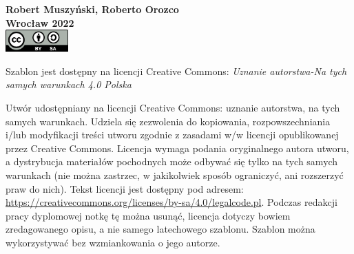 \thispagestyle{empty}
\mbox{}
\vfill

\noindent
{\bf Robert Muszyński, Roberto Orozco}\\
{\bf Wrocław 2022}\\[2ex]
  \includegraphics[width=0.18\textwidth]{figures/CC-BY-SA_icon_svg.png}\hfill
\begin{minipage}[b]{0.79\textwidth}
 \small Szablon jest dostępny na licencji Creative Commons: \emph{Uznanie au\-tor\-stwa-Na tych samych warunkach 4.0 Polska}
\end{minipage}\vspace{2ex}

\noindent
{\normalsize Utwór udostępniany na licencji Creative Commons: uznanie
  autorstwa, na tych samych warunkach. Udziela się zezwolenia do
  kopiowania, rozpowszechniania i/lub modyfikacji treści utworu
  zgodnie z zasadami w/w licencji opublikowanej przez Creative
  Commons. Licencja wymaga podania oryginalnego autora utworu, a
  dystrybucja materiałów pochodnych może odbywać się tylko na tych
  samych warunkach (nie można zastrzec, w jakikolwiek sposób
  ograniczyć, ani rozszerzyć praw do nich). Tekst licencji jest
  dostępny pod
  adresem: \url{https://creativecommons.org/licenses/by-sa/4.0/legalcode.pl}. Podczas
  redakcji pracy dyplomowej notkę tę można usunąć, licencja dotyczy
  bowiem zredagowanego opisu, a nie samego latechowego
  szablonu.  Szablon można wykorzystywać bez wzmiankowania o
  jego autorze.}

